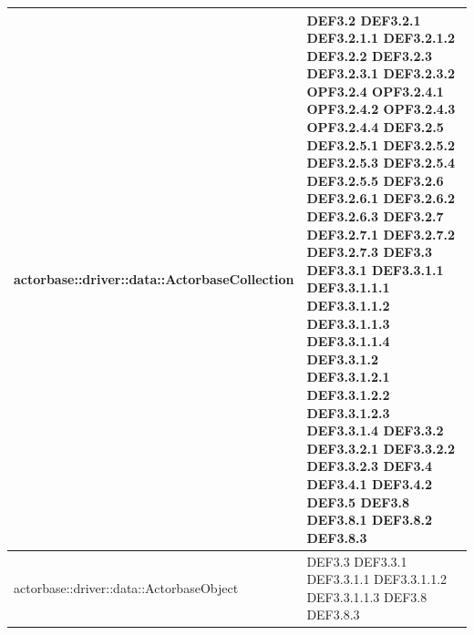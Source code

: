 \documentclass{scalatekids-article}
\begin{document}
\begin{longtable}[H]{|p{11.5cm}|p{5.5cm}|}
actorbase::driver::data::ActorbaseCollection & \multiLineCell[t]{DEF3.2 DEF3.2.1\\DEF3.2.1.1 DEF3.2.1.2\\DEF3.2.2 DEF3.2.3\\DEF3.2.3.1 DEF3.2.3.2\\OPF3.2.4 OPF3.2.4.1\\OPF3.2.4.2 OPF3.2.4.3\\OPF3.2.4.4 DEF3.2.5\\DEF3.2.5.1 DEF3.2.5.2\\DEF3.2.5.3 DEF3.2.5.4\\DEF3.2.5.5 DEF3.2.6\\DEF3.2.6.1 DEF3.2.6.2\\DEF3.2.6.3 DEF3.2.7\\DEF3.2.7.1 DEF3.2.7.2\\DEF3.2.7.3 DEF3.3\\DEF3.3.1 DEF3.3.1.1\\DEF3.3.1.1.1 DEF3.3.1.1.2\\DEF3.3.1.1.3 DEF3.3.1.1.4\\DEF3.3.1.2 DEF3.3.1.2.1\\DEF3.3.1.2.2 DEF3.3.1.2.3\\DEF3.3.1.4 DEF3.3.2\\DEF3.3.2.1 DEF3.3.2.2\\DEF3.3.2.3 DEF3.4\\DEF3.4.1 DEF3.4.2\\DEF3.5 DEF3.8\\DEF3.8.1 DEF3.8.2\\DEF3.8.3\\}\\
\hline
actorbase::driver::data::ActorbaseObject & \multiLineCell[t]{DEF3.3 DEF3.3.1\\DEF3.3.1.1 DEF3.3.1.1.2\\DEF3.3.1.1.3 DEF3.8\\DEF3.8.3\\}\\
\hline

\end{longtable}
\end{document}
